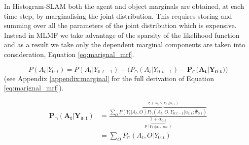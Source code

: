 In Histogram-SLAM both the agent and object marginals are obtained, at each time step, by marginalising the joint distribution.
This requires storing and summing over all the parameters of the joint distribution which is expensive.
Instead in MLMF we take advantage of the sparsity of the likelihood function and as a result we take only the dependent marginal components are taken into consideration, 
Equation \ref{eq:marignal_mrf}. 

\begin{equation}
 P(A_t|Y_{0:t})  =  P(A_t|Y_{0:t-1}) - \Big(P_{\cap}(A_t|Y_{0:t-1}) -  \mathbf{P_{\cap}(A_t|Y_{0:t}})  \Big) \label{eq:marignal_mrf} 
\end{equation}
(see Appendix \ref{appendix:marginal} for the full derivation of Equation \ref{eq:marignal_mrf}).

\begin{align}\label{eq:marignal_mrf_2}
 \mathbf{P_{\cap}(A_t|Y_{0:t})} &= \frac{ \sum\limits_{O} \overbrace{ P(Y_t|A_{t},O) P_{\cap}(A_t,O,Y_{0:t-1}|u_{1:t};\bar{\Psi}_{0:t})  }^{P_{\cap}(A_t,O,Y_{0:t}|u_{1:t})}}{\underbrace{1  + \alpha_{0:t}}_{P(Y_{0:t}|u_{1:t};\alpha_{0:t})}} \\
		       &= \sum\limits_{O} P_{\cap}(A_t,O|Y_{0:t})
\end{align}

